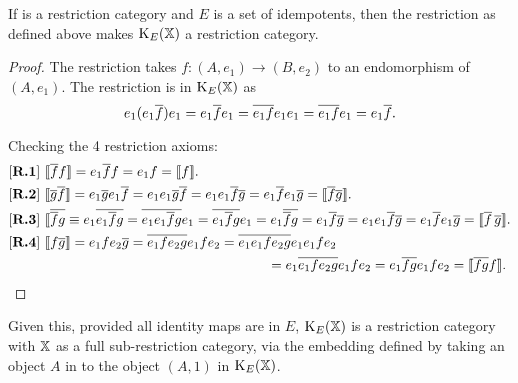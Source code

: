 \begin{proposition}\label{prop:spleisarestrictioncat}
  If \X is a restriction category and $E$ is a set of idempotents, then
  the restriction as defined above makes $\text{K}_{E}(\mathbb{X})$ a restriction category.
\end{proposition}
\begin{proof}
  The restriction takes $f:(A,e_1)\to (B,e_2)$ to an endomorphism of $(A,e_1)$. The restriction
  is in $\text{K}_{E}(\mathbb{X})$ as
  \[
    e_1 (e_1\overline{f}) e_1 = e_1 \overline{f} e_1
    = \overline{e_1 f} e_1 e_1
    = \overline{e_1 f} e_1
    = e_1 \overline{ f}.
  \]

  Checking the 4 restriction axioms:
  \begin{align*}
    &[\text{{\bfseries R.1}}]\  \llbracket\overline{f}f\rrbracket = e_1 \overline{f} f
    = e_1 f = \llbracket f\rrbracket.\\
    & [\text{{\textbf{R.2}}}]\ \llbracket\overline{g}\overline{f}\rrbracket =
    e_1\overline{g}  e_1\overline{f}
    = e_1 e_1\overline{g}  \overline{f} = e_1 e_1\overline{f}  \overline{g}
    = e_1\overline{f}  e_1\overline{g}  = \llbracket\overline{f}\overline{g}\rrbracket.\\
    & [\text{{\textbf{R.3}}}]\ \llbracket\overline{\overline{f} g } \equiv
    e_1 \overline{e_1 \overline{f}  g}
    =  \overline{e_1 e_1 \overline{f} g} e_1
    =  \overline{e_1 \overline{f} g} e_1
    =  e_1 \overline{\overline{f} g}
    = e_1 \overline{f}\overline{g}
    = e_{1}e_{1}\overline{f}\overline{g}
    = e_1 \overline{f}e_1\overline{g}
    = \llbracket\overline{f}\, \overline{g}\rrbracket.\\
    &[\text{{\textbf{R.4}}}]\  \llbracket f \overline{g} \rrbracket =
     e_1f e_2 \overline{g}
    = \overline{e_1 f e_2 g} e_1 f e_2
    = \overline{e_1 e_1 f e_2 g} e_1 e_1 f e_2 \\
    & \qquad \qquad \qquad \qquad \qquad \qquad \qquad \qquad \qquad \quad
    = e_1 \overline{ e_1 f e_2 g} e_1 f e_2
    = e_1 \overline{f g} e_1 f e_2
    = \llbracket\overline{f g} f\rrbracket.
  \end{align*}
\end{proof}

Given this, provided all identity maps are in $E$, $\text{K}_{E}(\mathbb{X})$ is a
restriction category with $\mathbb{X}$ as a full sub-restriction category, via
the embedding defined by taking an object $A$ in \X to  the object $(A,1)$
in $\text{K}_{E}(\mathbb{X})$.


